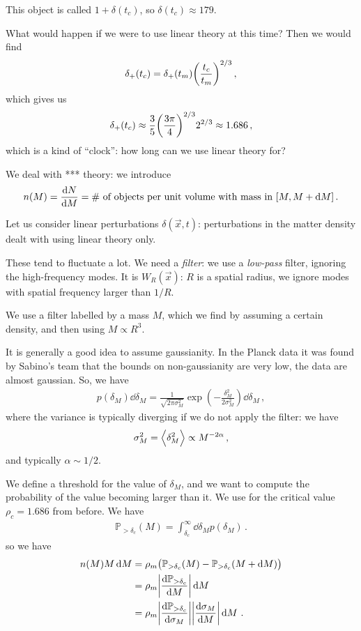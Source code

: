 \documentclass[main.tex]{subfiles}
\begin{document}
This object is called \(1 + \delta(t_c) \), so \(\delta (t_c) \approx 179\). 

What would happen if we were to use linear theory at this time? Then we would find 
%
\begin{align}
\delta_{+} (t_c) = \delta_{+}(t_m) \qty(\frac{t_c}{t_m})^{2/3}
\,,
\end{align}
%
which gives us
%
\begin{align}
\delta_+ (t_c) \approx \frac{3}{5} \qty(\frac{3 \pi }{4})^{2/3} 2^{2/3} \approx 1.686 
\,,
\end{align}
%
which is a kind of ``clock'': how long can we use linear theory for? 

We deal with *** theory: we introduce 
%
\begin{align}
n(M) = \dv{N}{M} = \text{\# of objects per unit volume with mass in } [M, M + \dd{M}]
\,.
\end{align}

Let us consider linear perturbations \(\delta(\vec{x}, t)\): perturbations in the matter density dealt with using linear theory only. 

These tend to fluctuate a lot. We need a \emph{filter}: we use a \emph{low-pass} filter, ignoring the high-frequency modes. It is \(W_R(\vec{x})\): \(R\) is a spatial radius, we ignore modes with spatial frequency larger than \(1/R\). 

We use a filter labelled by a mass \(M\), which we find by assuming a certain density, and then using \(M \propto R^3\). 

It is generally a good idea to assume gaussianity. In the Planck data it was found by Sabino's team that the bounds on non-gaussianity are very low, the data are almost gaussian. So, we have 
%
\begin{align}
p(\delta_{M}) \dd{ \delta_{M}} = \frac{1}{\sqrt{2 \pi \sigma_{M}^2}} \exp( - \frac{ \delta_{M}^2}{2 \sigma_{M}^2}) \dd{ \delta_{M}}
\,,
\end{align}
%
where the variance is typically diverging if we do not apply the filter: we have 
%
\begin{align}
\sigma_{M}^2    = \expval{ \delta_{M}^2 } \propto M^{-2 \alpha }
\,,
\end{align}
%
and typically \(\alpha \sim 1/2\). 

We define a threshold for the value of \(\delta_{M}\), and we want to compute the probability of the value becoming larger than it. 
We use for the critical value \(\rho_{c} = 1.686   \) from before. 
We have 
%
\begin{align}
\mathbb{P}_{> \delta_{c}}(M) = \int_{ \delta_{c}}^{ \infty } \dd{ \delta_{M}} p( \delta_{M})
\,.
\end{align}
%
so we have 
%
\begin{align}
n(M) M \dd{M} 
&= \rho_{m} \qty(\mathbb{P}_{ > \delta_{c}} (M) - \mathbb{P}_{ > \delta_{c}} (M + \dd{M})) \\
&= \rho_{m} \abs{ \dv{\mathbb{P}_{> \delta_{c}}}{M}} \dd{M}  \\
&= \rho_{m} \abs{ \dv{\mathbb{P}_{> \delta_{c}}}{ \sigma_{M}}} \abs{ \dv{\sigma_{M}}{M}} \dd{M}
\,.
\end{align}
\end{document}
